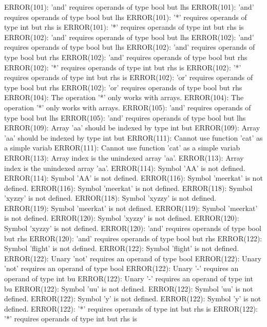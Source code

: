 \documentclass[12pt]{book}
\begin{document}
ERROR(101): 'and' requires operands of type bool but lhs        ERROR(101): 'and' requires operands of type bool but lhs
ERROR(101): '*' requires operands of type int but rhs is        ERROR(101): '*' requires operands of type int but rhs is
ERROR(102): 'and' requires operands of type bool but lhs        ERROR(102): 'and' requires operands of type bool but lhs
ERROR(102): 'and' requires operands of type bool but rhs        ERROR(102): 'and' requires operands of type bool but rhs
ERROR(102): '*' requires operands of type int but rhs is        ERROR(102): '*' requires operands of type int but rhs is
ERROR(102): 'or' requires operands of type bool but rhs         ERROR(102): 'or' requires operands of type bool but rhs 
ERROR(104): The operation '*' only works with arrays.                ERROR(104): The operation '*' only works with arrays.
ERROR(105): 'and' requires operands of type bool but lhs        ERROR(105): 'and' requires operands of type bool but lhs
ERROR(109): Array 'aa' should be indexed by type int but        ERROR(109): Array 'aa' should be indexed by type int but
ERROR(111): Cannot use function 'cat' as a simple variab        ERROR(111): Cannot use function 'cat' as a simple variab
ERROR(113): Array index is the unindexed array 'aa'.                ERROR(113): Array index is the unindexed array 'aa'.
ERROR(114): Symbol 'AA' is not defined.                                ERROR(114): Symbol 'AA' is not defined.
ERROR(116): Symbol 'meerkat' is not defined.                        ERROR(116): Symbol 'meerkat' is not defined.
ERROR(118): Symbol 'xyzzy' is not defined.                        ERROR(118): Symbol 'xyzzy' is not defined.
ERROR(119): Symbol 'meerkat' is not defined.                        ERROR(119): Symbol 'meerkat' is not defined.
ERROR(120): Symbol 'xyzzy' is not defined.                        ERROR(120): Symbol 'xyzzy' is not defined.
ERROR(120): 'and' requires operands of type bool but rhs        ERROR(120): 'and' requires operands of type bool but rhs
ERROR(122): Symbol 'flight' is not defined.                        ERROR(122): Symbol 'flight' is not defined.
ERROR(122): Unary 'not' requires an operand of type bool        ERROR(122): Unary 'not' requires an operand of type bool
ERROR(122): Unary '-' requires an operand of type int bu        ERROR(122): Unary '-' requires an operand of type int bu
ERROR(122): Symbol 'uu' is not defined.                                ERROR(122): Symbol 'uu' is not defined.
ERROR(122): Symbol 'y' is not defined.                                ERROR(122): Symbol 'y' is not defined.
ERROR(122): '*' requires operands of type int but rhs is        ERROR(122): '*' requires operands of type int but rhs is
\end{document}
